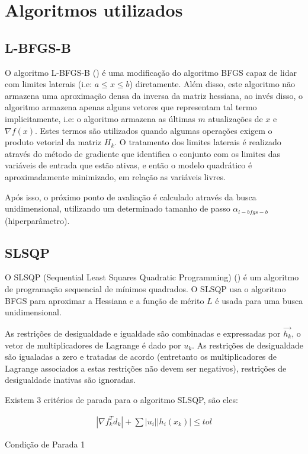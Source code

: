 \documentclass{article}
\begin{document}
\section{Algoritmos utilizados}
\subsection{L-BFGS-B}

O algoritmo L-BFGS-B (\cite{zhu1997algorithm}) é uma modificação do algoritmo BFGS capaz de lidar com limites laterais 
(i.e: $a \leq x \leq b$) diretamente. Além disso, este algoritmo não armazena uma aproximação densa da inversa da 
matriz hessiana, ao invés disso, o algoritmo armazena apenas alguns vetores que representam tal termo implicitamente, 
i.e: o algoritmo armazena as últimas $m$ atualizações de $x$ e $\nabla f(x)$. Estes termos são utilizados quando 
algumas operações exigem o produto vetorial da matriz $H_k$. \newline
O tratamento dos limites laterais é realizado através do método de gradiente que identifica o conjunto com os limites 
das variáveis de entrada que estão ativas, e então o modelo quadrático é aproximadamente minimizado, em relação as 
variáveis livres.

Após isso, o próximo ponto de avaliação é calculado através da busca unidimensional, utilizando um
determinado tamanho de passo $\alpha_{l-bfgs-b}$ (hiperparâmetro).
\subsection{SLSQP}
O SLSQP (Sequential Least Squares Quadratic Programming) (\cite{wendorff2016comparing}) é um algoritmo de programação sequencial de mínimos quadrados. O SLSQP usa o algoritmo BFGS para aproximar a Hessiana e a função de mérito $L$ é usada para uma busca unidimensional. 

As restrições de desigualdade e igualdade são combinadas e expressadas por $\overrightarrow{h_k}$, o vetor de 
multiplicadores de Lagrange é dado por $u_k$. As restrições de desigualdade são igualadas a zero e tratadas de acordo 
(entretanto os multiplicadores de Lagrange associados a estas restrições não devem ser negativos),  restrições de 
desigualdade inativas são ignoradas. 

Existem 3 critérios de parada para o algoritmo SLSQP, são eles:

\begin{eqfloat}[H]
\begin{equation}
\begin{split}
|\nabla f_k^T d_k| + \sum |u_i| |h_i(x_k)| \leq tol
\end{split}
\end{equation}
\caption{Condição de Parada 1}
\label{eqn:cp1}
\end{eqfloat}
\end{document}
